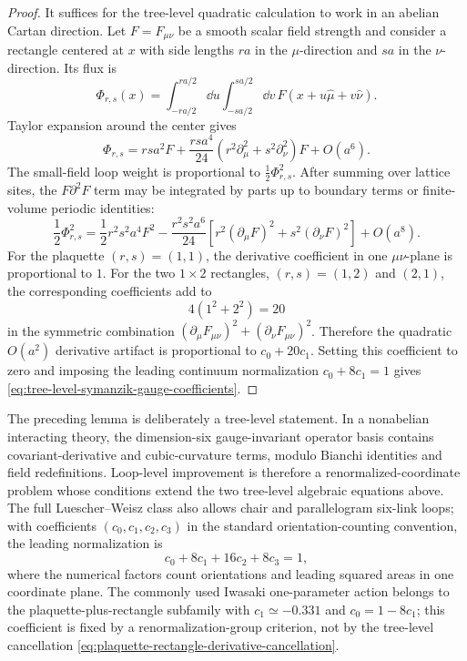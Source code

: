 \begin{proof}
It suffices for the tree-level quadratic calculation to work in an abelian
Cartan direction.  Let \(F=F_{\mu\nu}\) be a smooth scalar field strength and
consider a rectangle centered at \(x\) with side lengths \(ra\) in the
\(\mu\)-direction and \(sa\) in the \(\nu\)-direction.  Its flux is
\[
  \Phi_{r,s}(x)
  =
  \int_{-ra/2}^{ra/2}\!\dd u
  \int_{-sa/2}^{sa/2}\!\dd v\,
  F(x+u\hat\mu+v\hat\nu).
\]
Taylor expansion around the center gives
\begin{equation}
  \Phi_{r,s}
  =
  r s a^2 F
  +
  \frac{r s a^4}{24}
  \left(r^2\partial_\mu^2+s^2\partial_\nu^2\right)F
  +O(a^6).
  \label{eq:rectangle-flux-expansion}
\end{equation}
The small-field loop weight is proportional to \(\frac12\Phi_{r,s}^2\).
After summing over lattice sites, the \(F\partial^2F\) term may be integrated
by parts up to boundary terms or finite-volume periodic identities:
\begin{equation}
  \frac12\Phi_{r,s}^2
  =
  \frac12r^2s^2a^4F^2
  -
  \frac{r^2s^2a^6}{24}
  \left[
    r^2(\partial_\mu F)^2+s^2(\partial_\nu F)^2
  \right]
  +O(a^8).
  \label{eq:rectangle-flux-square-expansion}
\end{equation}
For the plaquette \((r,s)=(1,1)\), the derivative coefficient in one
\(\mu\nu\)-plane is proportional to \(1\).  For the two \(1\times2\)
rectangles, \((r,s)=(1,2)\) and \((2,1)\), the corresponding coefficients
add to
\[
  4(1^2+2^2)=20
\]
in the symmetric combination
\((\partial_\mu F_{\mu\nu})^2+(\partial_\nu F_{\mu\nu})^2\).  Therefore the
quadratic \(O(a^2)\) derivative artifact is proportional to \(c_0+20c_1\).
Setting this coefficient to zero and imposing the leading continuum
normalization \(c_0+8c_1=1\) gives
\eqref{eq:tree-level-symanzik-gauge-coefficients}.
\end{proof}

The preceding lemma is deliberately a tree-level statement.  In a
nonabelian interacting theory, the dimension-six gauge-invariant operator
basis contains covariant-derivative and cubic-curvature terms, modulo Bianchi
identities and field redefinitions.  Loop-level improvement is therefore a
renormalized-coordinate problem whose conditions extend the two tree-level
algebraic equations above.  The full Luescher--Weisz class also allows chair and
parallelogram six-link loops; with coefficients
\((c_0,c_1,c_2,c_3)\) in the standard orientation-counting convention, the
leading normalization is
\begin{equation}
  c_0+8c_1+16c_2+8c_3=1,
  \label{eq:luescher-weisz-normalization}
\end{equation}
where the numerical factors count orientations and leading squared areas in
one coordinate plane.  The commonly used Iwasaki one-parameter action belongs
to the plaquette-plus-rectangle subfamily with \(c_1\simeq -0.331\) and
\(c_0=1-8c_1\); this coefficient is fixed by a renormalization-group
criterion, not by the tree-level cancellation
\eqref{eq:plaquette-rectangle-derivative-cancellation}.

